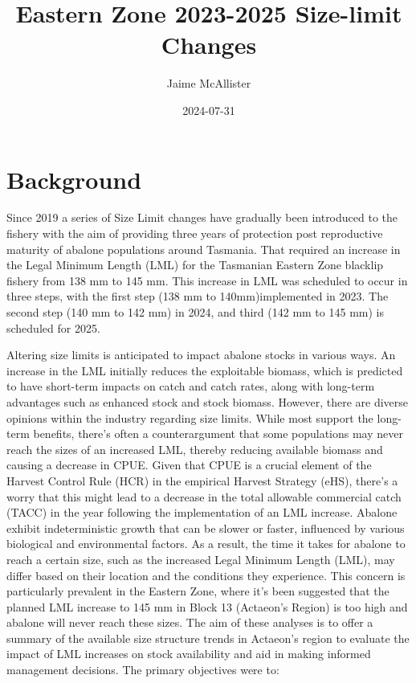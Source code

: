 \documentclass[
]{article}
\title{Eastern Zone 2023-2025 Size-limit Changes}
\author{Jaime McAllister}
\date{2024-07-31}
\begin{document}
\maketitle

{
\setcounter{tocdepth}{2}
\tableofcontents
}
\section{Background}\label{background}

Since 2019 a series of Size Limit changes have gradually been introduced to the fishery with the aim of providing three years of protection post reproductive maturity of abalone populations around Tasmania. That required an increase in the Legal Minimum Length (LML) for the Tasmanian Eastern Zone blacklip fishery from 138 mm to 145 mm. This increase in LML was scheduled to occur in three steps, with the first step (138 mm to 140mm)implemented in 2023. The second step (140 mm to 142 mm) in 2024, and third (142 mm to 145 mm) is scheduled for 2025.

Altering size limits is anticipated to impact abalone stocks in various ways. An increase in the LML initially reduces the exploitable biomass, which is predicted to have short-term impacts on catch and catch rates, along with long-term advantages such as enhanced stock and stock biomass. However, there are diverse opinions within the industry regarding size limits. While most support the long-term benefits, there's often a counterargument that some populations may never reach the sizes of an increased LML, thereby reducing available biomass and causing a decrease in CPUE. Given that CPUE is a crucial element of the Harvest Control Rule (HCR) in the empirical Harvest Strategy (eHS), there's a worry that this might lead to a decrease in the total allowable commercial catch (TACC) in the year following the implementation of an LML increase. Abalone exhibit indeterministic growth that can be slower or faster, influenced by various biological and environmental factors. As a result, the time it takes for abalone to reach a certain size, such as the increased Legal Minimum Length (LML), may differ based on their location and the conditions they experience. This concern is particularly prevalent in the Eastern Zone, where it's been suggested that the planned LML increase to 145 mm in Block 13 (Actaeon's Region) is too high and abalone will never reach these sizes. The aim of these analyses is to offer a summary of the available size structure trends in Actaeon's region to evaluate the impact of LML increases on stock availability and aid in making informed management decisions. The primary objectives were to:
\end{document}
